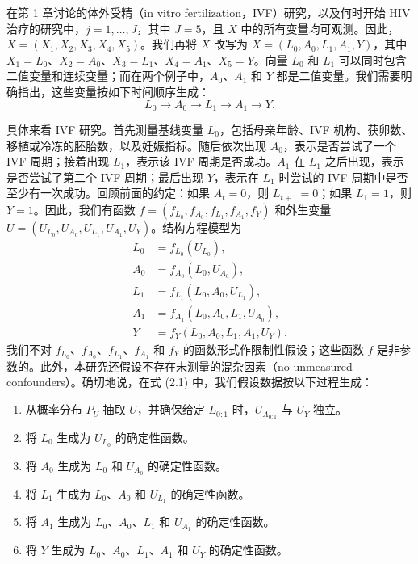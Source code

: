 在第 1 章讨论的体外受精（in vitro fertilization，IVF）研究，以及何时开始 HIV 治疗的研究中，$j=1,\ldots,J$，其中 $J=5$，且 $X$ 中的所有变量均可观测。因此，$X=(X_1,X_2,X_3,X_4,X_5)$。我们再将 $X$ 改写为 $X=(L_0,A_0,L_1,A_1,Y)$，其中 $X_1=L_0$、$X_2=A_0$、$X_3=L_1$、$X_4=A_1$、$X_5=Y$。向量 $L_0$ 和 $L_1$ 可以同时包含二值变量和连续变量；而在两个例子中，$A_0$、$A_1$ 和 $Y$ 都是二值变量。我们需要明确指出，这些变量按如下时间顺序生成：
\[
 L_0\to A_0\to L_1\to A_1\to Y.
\]

具体来看 IVF 研究。首先测量基线变量 $L_0$，包括母亲年龄、IVF 机构、获卵数、移植或冷冻的胚胎数，以及妊娠指标。随后依次出现 $A_0$，表示是否尝试了一个 IVF 周期；接着出现 $L_1$，表示该 IVF 周期是否成功。$A_1$ 在 $L_1$ 之后出现，表示是否尝试了第二个 IVF 周期；最后出现 $Y$，表示在 $L_1$ 时尝试的 IVF 周期中是否至少有一次成功。回顾前面的约定：如果 $A_t=0$，则 $L_{t+1}=0$；如果 $L_1=1$，则 $Y=1$。因此，我们有函数 $f=(f_{L_0},f_{A_0},f_{L_1},f_{A_1},f_Y)$ 和外生变量 $U=(U_{L_0},U_{A_0},U_{L_1},U_{A_1},U_Y)$。结构方程模型为
\begin{equation}
 \begin{aligned}
 L_0&=f_{L_0}(U_{L_0}),\\
 A_0&=f_{A_0}(L_0,U_{A_0}),\\
 L_1&=f_{L_1}(L_0,A_0,U_{L_1}),\\
 A_1&=f_{A_1}(L_0,A_0,L_1,U_{A_0}),\\
 Y&=f_Y(L_0,A_0,L_1,A_1,U_Y).
 \end{aligned}
 \tag{2.1}
\end{equation}
我们不对 $f_{L_0}$、$f_{A_0}$、$f_{L_1}$、$f_{A_1}$ 和 $f_Y$ 的函数形式作限制性假设；这些函数 $f$ 是非参数的。此外，本研究还假设不存在未测量的混杂因素（no unmeasured confounders）。确切地说，在式 (2.1) 中，我们假设数据按以下过程生成：
\begin{enumerate}
 \item 从概率分布 $P_U$ 抽取 $U$，并确保给定 $L_{0:1}$ 时，$U_{A_{0:1}}$ 与 $U_Y$ 独立。
 \item 将 $L_0$ 生成为 $U_{L_0}$ 的确定性函数。
 \item 将 $A_0$ 生成为 $L_0$ 和 $U_{A_0}$ 的确定性函数。
 \item 将 $L_1$ 生成为 $L_0$、$A_0$ 和 $U_{L_1}$ 的确定性函数。
 \item 将 $A_1$ 生成为 $L_0$、$A_0$、$L_1$ 和 $U_{A_1}$ 的确定性函数。
 \item 将 $Y$ 生成为 $L_0$、$A_0$、$L_1$、$A_1$ 和 $U_Y$ 的确定性函数。
\end{enumerate}

